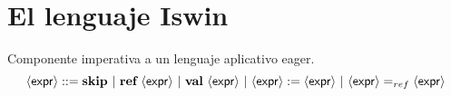 




%   
  \section{El lenguaje Iswin}
    \PN Componente imperativa a un lenguaje aplicativo eager.
    \[
      \expr ::= \textbf{skip} \ | \ \textbf{ref} \ \expr \ | \ \textbf{val} \ \expr \ | \  \expr := \expr  \ | \  \expr =_{ref} \expr 
    \]

